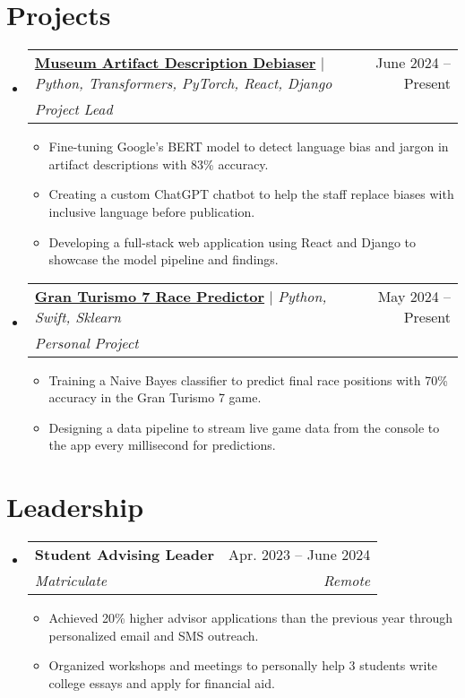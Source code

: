 \documentclass[letterpaper,11pt]{article}
\makeatletter
\newcommand{\resumeItem}[1]{
  \item\small{
    {#1 \vspace{-2pt}}
  }
}
\newcommand{\resumeSubheading}[4]{
  \vspace{-2pt}\item
    \begin{tabular*}{0.97\textwidth}[t]{l@{\extracolsep{\fill}}r}
      \textbf{#1} & #2 \\
      \textit{\small#3} & \textit{\small #4} \\
    \end{tabular*}\vspace{-7pt}
}
\newcommand{\myResumeProjectHeading}[3]{
	\item
    \begin{tabular*}{0.97\textwidth}{l@{\extracolsep{\fill}}r}
      \small#1 & #2 \\
      \textit{\small#3} \\
    \end{tabular*}\vspace{-7pt}
}
\newcommand{\resumeSubHeadingListStart}{\begin{itemize}[leftmargin=0.15in, label={}]}
\newcommand{\resumeSubHeadingListEnd}{\end{itemize}}
\newcommand{\resumeItemListStart}{\begin{itemize}}
\newcommand{\resumeItemListEnd}{\end{itemize}\vspace{-5pt}}
\makeatother
\begin{document}
\section{Projects}
    \resumeSubHeadingListStart
	\myResumeProjectHeading
	{\href{https://github.com/Student9676/carlos-artifact-tagging-bias}{\textbf{Museum Artifact Description Debiaser}} $|$ \emph{Python, Transformers, PyTorch, React, Django}}{June 2024 -- Present}
		  {Project Lead}
          \resumeItemListStart
            \resumeItem{Fine-tuning Google's BERT model to detect language bias and jargon in artifact descriptions with 83\% accuracy.}
            \resumeItem{Creating a custom ChatGPT chatbot to help the staff replace biases with inclusive language before publication.}
			\resumeItem{Developing a full-stack web application using React and Django to showcase the model pipeline and findings.}
          \resumeItemListEnd

      \myResumeProjectHeading
	{\href{https://github.com/Student9676/gt7predictor}{\textbf{Gran Turismo 7 Race Predictor}} $|$ \emph{Python, Swift, Sklearn}}{May 2024 -- Present}
          {Personal Project}
		  \resumeItemListStart
		  \resumeItem{Training a Naive Bayes classifier to predict final race positions with 70\% accuracy in the Gran Turismo 7 game.}
		  \resumeItem{Designing a data pipeline to stream live game data from the console to the app every millisecond for predictions.}
          \resumeItemListEnd
    \resumeSubHeadingListEnd

    


\section{Leadership}
  \resumeSubHeadingListStart
    \resumeSubheading
      {Student Advising Leader}{Apr. 2023 -- June 2024}
      {Matriculate}{Remote}
      \resumeItemListStart
        \resumeItem{Achieved 20\% higher advisor applications than the previous year through personalized email and SMS outreach.}
        \resumeItem{Organized workshops and meetings to personally help 3 students write college essays and apply for financial aid.}
      \resumeItemListEnd
  \resumeSubHeadingListEnd
\end{document}
